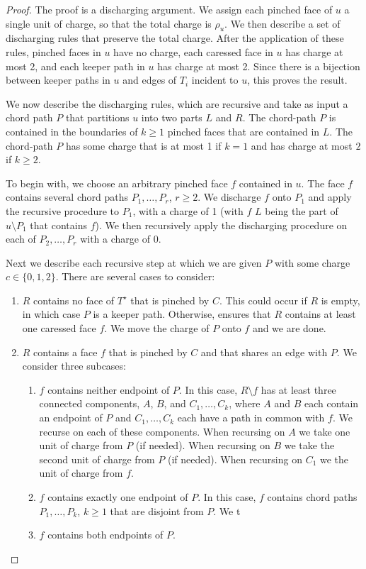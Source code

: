 \documentclass{patmorin}
\newcommand{\dual}[1]{{#1}^\star}
\begin{document}
\begin{proof}
   The proof is a discharging argument.  We assign each pinched face of $u$ a single unit of charge, so that the total charge is $\rho_u$.  We then describe a set of discharging rules that preserve the total charge.  After the application of these rules, pinched faces in $u$ have no charge, each caressed face in $u$ has charge at most 2, and each keeper path in $u$ has charge at most 2. 
Since there is a bijection between keeper paths in $u$ and edges of $T_i$ incident to $u$, this proves the result.

   We now describe the discharging rules, which are recursive and take as input a chord path $P$ that partitions $u$ into two parts $L$ and $R$.  The chord-path $P$ is contained in the boundaries of $k\ge 1$ pinched faces that are contained in $L$.  The chord-path $P$ has some charge that is at most 1 if $k=1$ and has charge at most $2$ if $k\ge 2$.

  To begin with, we choose an arbitrary pinched face $f$ contained in $u$.  The face $f$ contains several chord paths $P_1,\ldots,P_r$, $r\ge 2$.  We discharge $f$ onto $P_1$ and apply the recursive procedure to $P_1$, with a charge of 1 (with $f$ $L$ being the part of $u\setminus P_1$ that contains $f$).  We then recursively apply the discharging procedure on each of $P_2,\ldots,P_r$ with a charge of 0.

  Next we describe each recursive step at which we are given $P$ with
  some charge $c\in\{0,1,2\}$.  There are several cases to consider:
  \begin{enumerate}
     \item $R$ contains no face of $\dual{T}$ that is pinched by $C$.  This could occur if $R$ is empty, in which case $P$ is a keeper path.  Otherwise,  ensures that $R$ contains at least one caressed face $f$.  We move the charge of $P$ onto $f$ and we are done.

     \item $R$ contains a face $f$ that is pinched by $C$ and that shares an edge with $P$.  We consider three subcases:
     \begin{enumerate}
        \item $f$ contains neither endpoint of $P$. In this case, $R\setminus f$ has at least three connected components, $A$, $B$, and $C_1,\ldots,C_k$, where $A$ and $B$ each contain an endpoint of $P$ and $C_1,\ldots,C_k$ each have a path in common with $f$.  We recurse on each of these components. When recursing on $A$ we take one unit of charge from $P$ (if needed).  When recursing on $B$ we take the second unit of charge from $P$ (if needed).  When recursing on $C_1$ we the unit of charge from $f$.
        \item $f$ contains exactly one endpoint of $P$.  In this case, $f$ contains chord paths $P_1,\ldots,P_k$, $k\ge 1$ that are disjoint from $P$.  We t
        \item $f$ contains both endpoints of $P$.
     \end{enumerate}
  \end{enumerate}


\end{proof}
\end{document}
